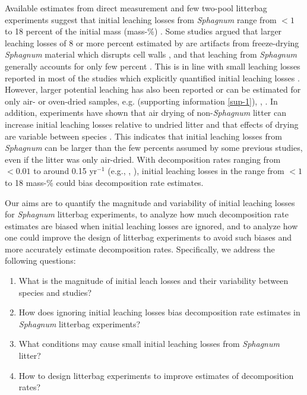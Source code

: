 \documentclass[bg, manuscript]{copernicus}
\begin{document}
Available estimates from direct measurement and few two-pool litterbag experiments suggest that initial leaching losses from \emph{Sphagnum} range from \(<1\) to 18 percent of the initial mass (mass-\%) \citep{Coulson.1978, Scheffer.2001, Moore.2001, Thormann.2002, Limpens.2003, Castells.2005, Moore.2007, DelGiudice.2017, Mastny.2018, Muller.2023}. Some studies argued that larger leaching losses of 8 or more percent estimated by \citet{Scheffer.2001} are artifacts from freeze-drying \emph{Sphagnum} material which disrupts cell walls \citep{Limpens.2003}, and that leaching from \emph{Sphagnum} generally accounts for only few percent \citep{Johnson.1991}. This is in line with small leaching losses reported in most of the studies which explicitly quantified initial leaching losses \citep{Coulson.1978, Moore.2001, Thormann.2002, Limpens.2003, Castells.2005, Mastny.2018}. However, larger potential leaching has also been reported or can be estimated for only air- or oven-dried samples, e.g. \citet{Moore.2007} (supporting information \ref{sup-1}), \citet{Thormann.2001}, \citet{Muller.2023}. In addition, experiments have shown that air drying of non-\emph{Sphagnum} litter can increase initial leaching losses relative to undried litter \citep{Gessner.1989, Barlocher.1997} and that effects of drying are variable between species \citep{Taylor.1996}. This indicates that initial leaching losses from \emph{Sphagnum} can be larger than the few percents assumed by some previous studies, even if the litter was only air-dried. With decomposition rates ranging from \(<0.01\) to around 0.15 yr\(^{-1}\) (e.g., \citet{Moore.2007}, \citet{Turetsky.2008}), initial leaching losses in the range from \(<1\) to 18 mass-\% could bias decomposition rate estimates.

Our aims are to quantify the magnitude and variability of initial leaching losses for \emph{Sphagnum} litterbag experiments, to analyze how much decomposition rate estimates are biased when initial leaching losses are ignored, and to analyze how one could improve the design of litterbag experiments to avoid such biases and more accurately estimate decomposition rates. Specifically, we address the following questions:

\begin{enumerate}
\def\labelenumi{\arabic{enumi}.}
\item
  What is the magnitude of initial leach losses and their variability between species and studies?
\item
  How does ignoring initial leaching losses bias decomposition rate estimates in \emph{Sphagnum} litterbag experiments?
\item
  What conditions may cause small initial leaching losses from \emph{Sphagnum} litter?
\item
  How to design litterbag experiments to improve estimates of decomposition rates?
\end{enumerate}
\end{document}
